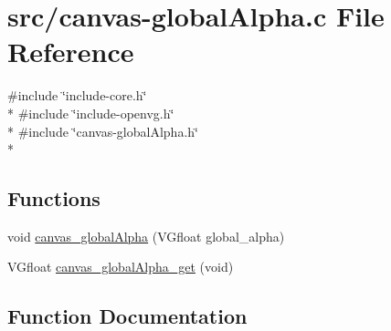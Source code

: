 \hypertarget{canvas-globalAlpha_8c}{}\section{src/canvas-\/global\+Alpha.c File Reference}
\label{canvas-globalAlpha_8c}
{\ttfamily \#include \char`\"{}include-\/core.\+h\char`\"{}}\\*
{\ttfamily \#include \char`\"{}include-\/openvg.\+h\char`\"{}}\\*
{\ttfamily \#include \char`\"{}canvas-\/global\+Alpha.\+h\char`\"{}}\\*
\subsection*{Functions}
\begin{DoxyCompactItemize}
\item 
void \hyperlink{canvas-globalAlpha_8c_a8610df8d07d153c5f5723f646c52887c}{canvas\+\_\+global\+Alpha} (V\+Gfloat global\+\_\+alpha)
\item 
V\+Gfloat \hyperlink{canvas-globalAlpha_8c_aa97dd7621c4e59c763330a0ae7fa82a8}{canvas\+\_\+global\+Alpha\+\_\+get} (void)
\end{DoxyCompactItemize}


\subsection{Function Documentation}
\hypertarget{canvas-globalAlpha_8c_a8610df8d07d153c5f5723f646c52887c}{}
